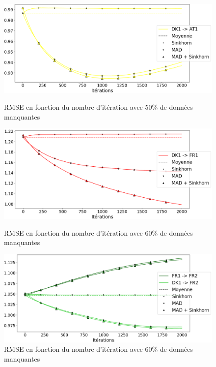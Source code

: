 \documentclass[acmsmall, natbib=false, nonacm]{acmart}
\begin{document}
\begin{figure}[H]
    \begin{minipage}[b]{0.4\linewidth}
		\centering \includegraphics[scale=0.14]{images/50_biais_AT1.png}
		\caption{RMSE en fonction du nombre d'itération avec 50\% de données manquantes}
	\end{minipage}\hfill
    \begin{minipage}[b]{0.4\linewidth}
		\centering \includegraphics[scale=0.14]{images/60_biais_FR1.png}
		\caption{RMSE en fonction du nombre d'itération avec 60\% de données manquantes}
	\end{minipage}\hfill
    \begin{minipage}[b]{0.4\linewidth}
		\centering \includegraphics[scale=0.14]{images/60_biais_FR2.png}
		\caption{RMSE en fonction du nombre d'itération avec 60\% de données manquantes}
	\end{minipage}
\end{figure}
\end{document}
